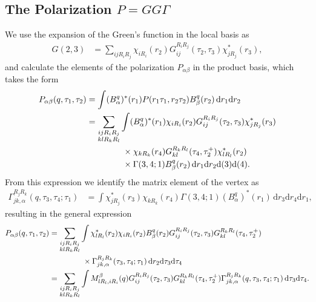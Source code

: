 \documentclass[12pt,a4paper]{scrartcl}
\numberwithin{equation}{section}
\begin{document}
\subsection{The Polarization $P=GG\Gamma$}
We use the expansion of the Green's function in the local basis as
\begin{align}
 G(2,3)  
 &= \sum_{ijR_iR_j} \chi_{iR_i}(r_2) G^{R_iR_j}_{ij}(\tau_2,\tau_3) \chi^*_{jR_j}(r_3),
\end{align}
and calculate the elements of the polarization $P_{\alpha\beta}$
in the product basis, which takes the form
\begin{align}
 P_{\alpha\beta}(q,\tau_1,\tau_2)
 &= \int (B^{q}_{\alpha})^*(r_1) P(r_1\tau_1,r_2\tau_2) B^{q}_{\beta}(r_2) 
 \, \mathrm{d}r_1 \mathrm{d}r_2 \\
%
&= \sum_{ \substack{ijR_iR_j \\ klR_kR_l}} \int (B^{q}_{\alpha})^*(r_1) 
     \chi_{iR_i}(r_2) G^{R_iR_j}_{ij}(\tau_2,\tau_3) \chi^*_{jR_j}(r_3) \nonumber \\
& \hspace{1.5cm}\times  \chi_{kR_k}(r_4) G^{R_kR_l}_{kl}(\tau_4,\tau_2^+) \chi^*_{lR_l}(r_2) \nonumber \\
& \hspace{1.5cm}	\times  \Gamma(3,4;1)  B^{q}_{\beta}(r_2) 
       \,  \mathrm{d}r_1 \mathrm{d}r_2\mathrm{d}(3)\mathrm{d}(4) .
\end{align}
From this expression we identify the matrix element of the 
vertex as
\begin{align}
\Gamma^{R_jR_k}_{jk,\alpha}(q,\tau_3,\tau_4;\tau_1)
&= \int \chi^*_{jR_j}(r_3) \chi_{kR_k}(r_4) \Gamma(3,4;1) (B^{q}_{\alpha})^*(r_1)
    \,\mathrm{d}r_3\mathrm{d}r_4 \mathrm{d}r_1,
\end{align}
resulting in the general expression
\begin{align}
 P_{\alpha\beta}(q,\tau_1,\tau_2)
%
&= \sum_{ \substack{ijR_iR_j \\ klR_kR_l}} \int 
     \chi^*_{lR_l}(r_2) \chi_{iR_i}(r_2) B^{q}_{\beta}(r_2)
      G^{R_iR_j}_{ij}(\tau_2,\tau_3) G^{R_kR_l}_{kl}(\tau_4,\tau_2^+)  \nonumber \\
& \hspace{1.5cm} \times  \Gamma^{R_jR_k}_{jk,\alpha}(\tau_3,\tau_4;\tau_1)  
          \,  \mathrm{d}r_2\mathrm{d}\tau_3 \mathrm{d}\tau_4 \\
%
&= \sum_{ \substack{ijR_iR_j \\ klR_kR_l}} \int 
     M^{\beta}_{lR_l,iR_i}(q)
      G^{R_iR_j}_{ij}(\tau_2,\tau_3) G^{R_kR_l}_{kl}(\tau_4,\tau_2^+)  
      \Gamma^{R_jR_k}_{jk,\alpha}(q,\tau_3,\tau_4;\tau_1)  
          \,  \mathrm{d}\tau_3 \mathrm{d}\tau_4.
\end{align}
\end{document}
